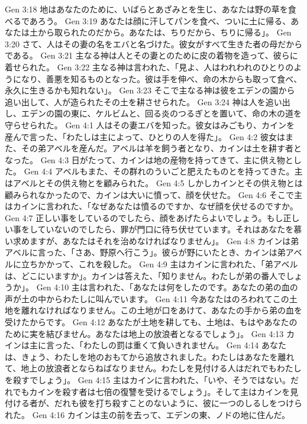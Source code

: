 Gen 3:18  地はあなたのために、いばらとあざみとを生じ、あなたは野の草を食べるであろう。
Gen 3:19  あなたは顔に汗してパンを食べ、ついに土に帰る、あなたは土から取られたのだから。あなたは、ちりだから、ちりに帰る」。
Gen 3:20  さて、人はその妻の名をエバと名づけた。彼女がすべて生きた者の母だからである。
Gen 3:21  主なる神は人とその妻とのために皮の着物を造って、彼らに着せられた。
Gen 3:22  主なる神は言われた、「見よ、人はわれわれのひとりのようになり、善悪を知るものとなった。彼は手を伸べ、命の木からも取って食べ、永久に生きるかも知れない」。
Gen 3:23  そこで主なる神は彼をエデンの園から追い出して、人が造られたその土を耕させられた。
Gen 3:24  神は人を追い出し、エデンの園の東に、ケルビムと、回る炎のつるぎとを置いて、命の木の道を守らせられた。
Gen 4:1  人はその妻エバを知った。彼女はみごもり、カインを産んで言った、「わたしは主によって、ひとりの人を得た」。
Gen 4:2  彼女はまた、その弟アベルを産んだ。アベルは羊を飼う者となり、カインは土を耕す者となった。
Gen 4:3  日がたって、カインは地の産物を持ってきて、主に供え物とした。
Gen 4:4  アベルもまた、その群れのういごと肥えたものとを持ってきた。主はアベルとその供え物とを顧みられた。
Gen 4:5  しかしカインとその供え物とは顧みられなかったので、カインは大いに憤って、顔を伏せた。
Gen 4:6  そこで主はカインに言われた、「なぜあなたは憤るのですか、なぜ顔を伏せるのですか。
Gen 4:7  正しい事をしているのでしたら、顔をあげたらよいでしょう。もし正しい事をしていないのでしたら、罪が門口に待ち伏せています。それはあなたを慕い求めますが、あなたはそれを治めなければなりません」。
Gen 4:8  カインは弟アベルに言った、「さあ、野原へ行こう」。彼らが野にいたとき、カインは弟アベルに立ちかかって、これを殺した。
Gen 4:9  主はカインに言われた、「弟アベルは、どこにいますか」。カインは答えた、「知りません。わたしが弟の番人でしょうか」。
Gen 4:10  主は言われた、「あなたは何をしたのです。あなたの弟の血の声が土の中からわたしに叫んでいます。
Gen 4:11  今あなたはのろわれてこの土地を離れなければなりません。この土地が口をあけて、あなたの手から弟の血を受けたからです。
Gen 4:12  あなたが土地を耕しても、土地は、もはやあなたのために実を結びません。あなたは地上の放浪者となるでしょう」。
Gen 4:13  カインは主に言った、「わたしの罰は重くて負いきれません。
Gen 4:14  あなたは、きょう、わたしを地のおもてから追放されました。わたしはあなたを離れて、地上の放浪者とならねばなりません。わたしを見付ける人はだれでもわたしを殺すでしょう」。
Gen 4:15  主はカインに言われた、「いや、そうではない。だれでもカインを殺す者は七倍の復讐を受けるでしょう」。そして主はカインを見付ける者が、だれも彼を打ち殺すことのないように、彼に一つのしるしをつけられた。
Gen 4:16  カインは主の前を去って、エデンの東、ノドの地に住んだ。
